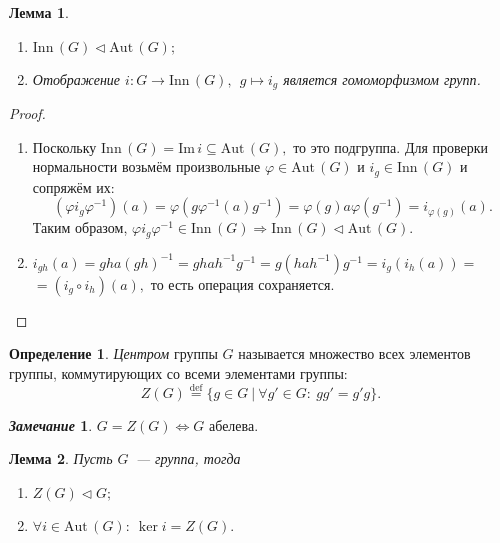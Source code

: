 \documentclass[a4paper, 14pt]{extarticle}
\newcommand{\deq}{\stackrel{\mathrm{def}}{=}}
\newcommand{\suchthat}{{:}{ } \ }
\newcommand{\im}{\mathrm{Im} \,}
\newcommand{\Aut}{\mathrm{Aut} \,}
\newcommand{\Inn}{\mathrm{Inn} \,}
\renewcommand{\phi}{\varphi}
\theoremstyle{definition}
\newtheorem*{remark}{\textit{Замечание}}
\newtheorem{definition}{Определение}
\theoremstyle{plain}
\numberwithin{theorem}{section}
\numberwithin{definition}{section}
\numberwithin{statement}{section}
\newtheorem{lemma}{Лемма}
\numberwithin{lemma}{section}
\numberwithin{consequence}{section}
\begin{document}
          \begin{lemma}
          \
            \begin{enumerate}
            \setlength\itemsep{0.1em}
                \item ${\Inn(G) \lhd \Aut(G);}$
                \item Отображение ${i : G \rightarrow \Inn(G), \ \ g \mapsto i_g}$ является гомоморфизмом групп.
            \end{enumerate}
          \end{lemma}
          \begin{proof}
          \
            \begin{enumerate}
                \setlength\itemsep{0.1em}
                \item Поскольку ${\Inn(G) = \im i \subseteq \Aut(G),}$ то это подгруппа. \newline
              Для проверки нормальности возьмём произвольные ${\phi \in \Aut(G)}$ и ${i_g \in \Inn(G)}$ и сопряжём их:
              \begin{equation*}
                  (\phi i_g \phi^{-1})(a) = \phi(g \phi^{-1}(a) g^{-1}) =  \phi(g) a \phi(g^{-1}) = i_{\phi(g)}(a).
              \end{equation*}
              Таким образом, ${\phi i_g \phi^{-1} \in \Inn(G) \Rightarrow \Inn(G) \lhd \Aut(G).}$
                \item ${i_{gh}(a) = gha(gh)^{-1} = ghah^{-1}g^{-1} = g(hah^{-1})g^{-1} = i_g(i_h(a)) =}$ ${= (i_g \circ i_h)(a),}$ то есть операция сохраняется. \qedhere
            \end{enumerate}
            \end{proof}
            \begin{definition}
              \textit{Центром} группы $G$ называется множество всех элементов группы, коммутирующих со всеми элементами группы:
              \begin{equation*}
                  Z(G) \deq \{g \in G \ | \ \forall g' \in G\suchthat gg' = g'g\}.
              \end{equation*}
          \end{definition}
          \begin{remark}
              ${G = Z(G) \Leftrightarrow G}$ абелева.
          \end{remark}
          \newpage
          \begin{lemma}
              Пусть $G$~--- группа, тогда
              \begin{enumerate}
              \setlength\itemsep{0.1em}
                  \item ${Z(G) \lhd G;}$
                  \item ${\forall i \in \Aut(G)\suchthat \ker i = Z(G).}$
              \end{enumerate}
          \end{lemma}
\end{document}
